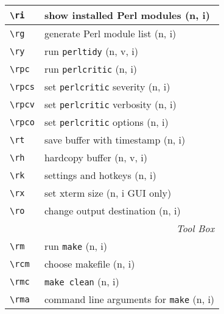 \documentclass[oneside,10pt,landscape,DIV17]{scrartcl}
\begin{document}
\begin{multicols}{2}
\begin{tabular}[]{|p{11mm}|p{61mm}|}
\hline \verb'\ri'    & show installed Perl modules              \hfill (n, i)   \\
\hline \verb'\rg'    & generate Perl module list                \hfill (n, i)   \\
\hline \verb'\ry'    & run \verb'perltidy'                      \hfill (n, v, i)\\
\hline \verb'\rpc'   & run \verb'perlcritic'                    \hfill (n, i)   \\
\hline \verb'\rpcs'  & set \verb'perlcritic' severity           \hfill (n, i)   \\
\hline \verb'\rpcv'  & set \verb'perlcritic' verbosity          \hfill (n, i)   \\
\hline \verb'\rpco'  & set \verb'perlcritic' options            \hfill (n, i)   \\
\hline \verb'\rt'    & save buffer with timestamp               \hfill (n, i)   \\
\hline \verb'\rh'    & hardcopy buffer                          \hfill (n, v, i)\\
\hline \verb'\rk'    & settings and hotkeys                     \hfill (n, i)   \\
\hline \verb'\rx'    & set xterm size                           \hfill (n, i {\tiny GUI only})\\
\hline \verb'\ro'    & change output destination                \hfill (n, i)   \\
\hline
\hline
\multicolumn{2}{|r|}{\textsl{Tool Box}} \\[1.0ex]
\hline \verb'\rm'    & run \texttt{make}                        \hfill (n, i)   \\
\hline \verb'\rcm'   & choose makefile                          \hfill (n, i)   \\
\hline \verb'\rmc'   & \texttt{make clean}                      \hfill (n, i)   \\
\hline \verb'\rma'   & command line arguments for \texttt{make} \hfill (n, i)   \\
\hline
\end{tabular}%
%


\end{multicols}
\end{document}
